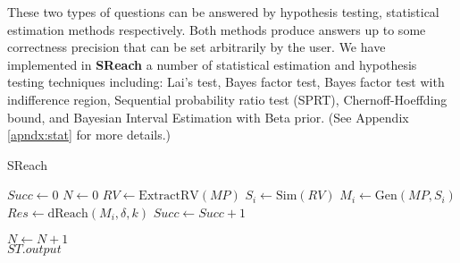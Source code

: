 These two types of questions can be answered by hypothesis testing, 
statistical estimation methods respectively. Both methods produce answers up to some correctness 
precision that can be set arbitrarily by the user.
We have implemented in {\bf SReach} a number of statistical estimation and hypothesis testing techniques including: {Lai's test}, {Bayes factor test}, {Bayes factor test with indifference region}, {Sequential probability ratio test (SPRT)}, {Chernoff-Hoeffding bound}, and Bayesian Interval Estimation with Beta prior. (See Appendix \ref{apndx:stat} for more details.) 
\begin{algorithm}
  \centering
  \caption{SReach}
  \label{fig:sreach}
  \begin{algorithmic}[1]
        \State $Succ \gets 0$	
        \State $N \gets 0$	
        \State $RV \gets \mathrm{ExtractRV}(MP)$	
        \Repeat
            \State $S_i \gets \mathrm{Sim}(RV)$		
            \State $M_i \gets \mathrm{Gen}(MP, S_i)$	
            \State $Res \gets \mathrm{dReach}(M_i, \delta, k)$	
		\State $Succ \gets Succ + 1$
	    
	  \EndIf
	\State $N \gets N + 1$
        	\\
	\quad\hspace{0.5ex} \Return $ST.output$
   \EndFunction
  \end{algorithmic}
\end{algorithm}

